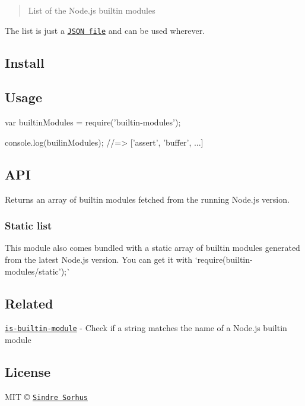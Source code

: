 \begin{quote}
List of the Node.\+js builtin modules \end{quote}


The list is just a \href{builtin-modules.json}{\tt J\+S\+ON file} and can be used wherever.

\subsection*{Install}




\subsection*{Usage}


\begin{DoxyCode}
var builtinModules = require('builtin-modules');

console.log(builinModules);
//=> ['assert', 'buffer', ...]
\end{DoxyCode}


\subsection*{A\+PI}

Returns an array of builtin modules fetched from the running Node.\+js version.

\subsubsection*{Static list}

This module also comes bundled with a static array of builtin modules generated from the latest Node.\+js version. You can get it with `require(\textquotesingle{}builtin-\/modules/static');\`{}

\subsection*{Related}


\begin{DoxyItemize}
\item \href{https://github.com/sindresorhus/is-builtin-module}{\tt is-\/builtin-\/module} -\/ Check if a string matches the name of a Node.\+js builtin module
\end{DoxyItemize}

\subsection*{License}

M\+IT © \href{http://sindresorhus.com}{\tt Sindre Sorhus} 
